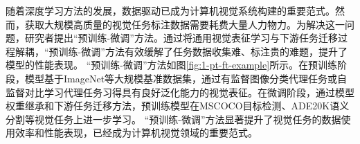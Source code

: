 随着深度学习方法的发展，数据驱动已成为计算机视觉系统构建的重要范式。然而，获取大规模高质量的视觉任务标注数据需要耗费大量人力物力。为解决这一问题，研究者提出“预训练-微调”方法。通过将通用视觉表征学习与下游任务迁移过程解耦，“预训练-微调”方法有效缓解了任务数据收集难、标注贵的难题，提升了模型的性能表现。
“预训练-微调”方法如图\ref{fig:1-pt-ft-example}所示。在预训练阶段，模型基于ImageNet\cite{deng2009imagenet}等大规模基准数据集，通过有监督图像分类代理任务\cite{alexnet}或自监督对比学习代理任务\cite{chen2020simple}习得具有良好泛化能力的视觉表征。在微调阶段，通过模型权重继承和下游任务迁移方法，预训练模型在MSCOCO目标检测\cite{chen2015microsoft}、ADE20K语义分割\cite{zhou2019ade}等视觉任务上进一步学习。
“预训练-微调”方法显著提升了视觉任务的数据使用效率和性能表现，已经成为计算机视觉领域的重要范式。


